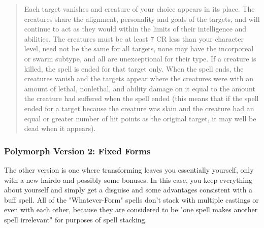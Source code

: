 \begin{quote}
\begin{small}
\end{small}

Each target vanishes and creature of your choice appears in its place. The creatures share the alignment, personality and goals of the targets, and will continue to act as they would within the limits of their intelligence and abilities. The creatures must be at least 7 CR less than your character level, need not be the same for all targets, none may have the incorporeal or swarm subtype, and all are unexceptional for their type. If a creature is killed, the spell is ended for that target only. When the spell ends, the creatures vanish and the targets appear where the creatures were with an amount of lethal, nonlethal, and ability damage on it equal to the amount the creature had suffered when the spell ended (this means that if the spell ended for a target because the creature was slain and the creature had an equal or greater number of hit points as the original target, it may well be dead when it appears).

\end{quote}

\subsubsection{Polymorph Version 2: Fixed Forms}

The other version is one where transforming leaves you essentially yourself, only with a new hairdo and possibly some bonuses. In this case, you keep everything about yourself and simply get a disguise and some advantages consistent with a buff spell. All of the "Whatever-Form" spells don't stack with multiple castings or even with each other, because they are considered to be "one spell makes another spell irrelevant" for purposes of spell stacking.


